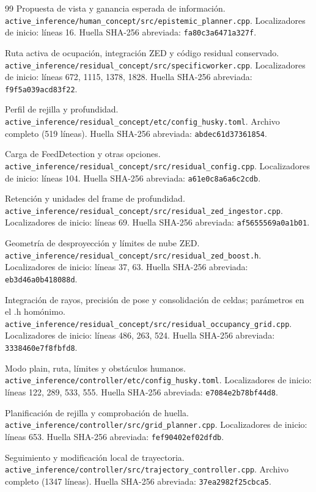 \documentclass[11pt,a4paper]{article}
\newcommand{\code}[1]{\nolinkurl{#1}}
\newcommand{\file}[1]{\nolinkurl{#1}}
\begin{document}
\begin{thebibliography}{99}
 Propuesta de vista y ganancia esperada de información.
\file{active_inference/human_concept/src/epistemic_planner.cpp}.
Localizadores de inicio: líneas 16. Huella SHA-256 abreviada: \code{fa80c3a6471a327f}.

 Ruta activa de ocupación, integración ZED y código residual conservado.
\file{active_inference/residual_concept/src/specificworker.cpp}.
Localizadores de inicio: líneas 672, 1115, 1378, 1828. Huella SHA-256 abreviada: \code{f9f5a039acd83f22}.

 Perfil de rejilla y profundidad.
\file{active_inference/residual_concept/etc/config_husky.toml}.
Archivo completo (519 líneas). Huella SHA-256 abreviada: \code{abdec61d37361854}.

 Carga de FeedDetection y otras opciones.
\file{active_inference/residual_concept/src/residual_config.cpp}.
Localizadores de inicio: líneas 104. Huella SHA-256 abreviada: \code{a61e0c8a6a6c2cdb}.

 Retención y unidades del frame de profundidad.
\file{active_inference/residual_concept/src/residual_zed_ingestor.cpp}.
Localizadores de inicio: líneas 69. Huella SHA-256 abreviada: \code{af5655569a0a1b01}.

 Geometría de desproyección y límites de nube ZED.
\file{active_inference/residual_concept/src/residual_zed_boost.h}.
Localizadores de inicio: líneas 37, 63. Huella SHA-256 abreviada: \code{eb3d46a0b418088d}.

 Integración de rayos, precisión de pose y consolidación de celdas; parámetros en el .h homónimo.
\file{active_inference/residual_concept/src/residual_occupancy_grid.cpp}.
Localizadores de inicio: líneas 486, 263, 524. Huella SHA-256 abreviada: \code{3338460e7f8fbfd8}.

 Modo plain, ruta, límites y obstáculos humanos.
\file{active_inference/controller/etc/config_husky.toml}.
Localizadores de inicio: líneas 122, 289, 533, 555. Huella SHA-256 abreviada: \code{e7084e2b78bf44d8}.

 Planificación de rejilla y comprobación de huella.
\file{active_inference/controller/src/grid_planner.cpp}.
Localizadores de inicio: líneas 653. Huella SHA-256 abreviada: \code{fef90402ef02dfdb}.

 Seguimiento y modificación local de trayectoria.
\file{active_inference/controller/src/trajectory_controller.cpp}.
Archivo completo (1347 líneas). Huella SHA-256 abreviada: \code{37ea2982f25cbca5}.


\end{thebibliography}
\end{document}
